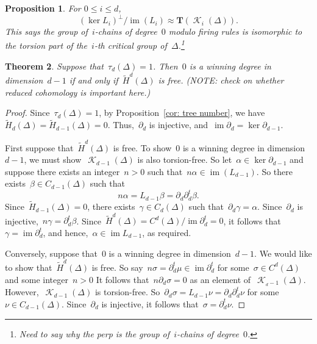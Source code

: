 \documentclass[12pt]{article}
\newcommand{\T}{\mathbf{T}}
\newcommand{\tH}{\widetilde{H}}
\DeclareMathOperator{\im}{\mathrm{im}}
\DeclareMathOperator{\crit}{\mathcal{K}}
\newtheorem{theorem}{Theorem}[section]
\newtheorem{prop}[theorem]{Proposition}
\theoremstyle{definition}
\theoremstyle{remark}
\begin{document}
\begin{prop}\label{prop: deg 0 iso} For $0\leq i\leq d$, 
\[
  (\ker L_i)^{\perp}/\im(L_i)\approx \T(\crit_i(\Delta)).
\]
This says the group of~$i$-chains of degree~$0$ modulo firing rules is
isomorphic to the torsion part of the~$i$-th critical group
of~$\Delta$.\footnote{Need to say why the perp is the group of~$i$-chains of
degree~$0$.}
\end{prop}

\begin{theorem} Suppose that~$\tau_d(\Delta)=1$.  Then~$0$ is a winning degree in
  dimension~$d-1$ if and only if~$\tH^d(\Delta)$ is free. (NOTE: check on
  whether reduced cohomology is important here.)
\end{theorem}
\begin{proof} Since~$\tau_d(\Delta)=1$, by Proposition~\ref{cor: tree number},
  we have~$\tH_d(\Delta)=\tH_{d-1}(\Delta)=0$.  Thus,~$\partial_d$ is injective,
  and~$\im\partial_d=\ker\partial_{d-1}$.

  First suppose that~$\tH^d(\Delta)$ is free.  To show~$0$ is a winning degree
  in dimension~$d-1$, we must show~$\crit_{d-1}(\Delta)$ is also torsion-free.
  So let~$\alpha\in\ker\partial_{d-1}$ and suppose there exists an
  integer~$n>0$ such that~$n\alpha\in\im(L_{d-1})$.  So there exists~$\beta\in
  C_{d-1}(\Delta)$ such that
  \[
    n\alpha=L_{d-1}\beta=\partial_d\partial_d^t\beta.
  \]
  Since~$\tH_{d-1}(\Delta)=0$,
  there exists~$\gamma\in C_d(\Delta)$ such that~$\partial_d\gamma=\alpha$.  
  Since~$\partial_d$ is injective,~$n\gamma=\partial_d^t\beta$.
  Since~$\tH^d(\Delta)=C^d(\Delta)/\im\partial_d^t=0$, it follows
  that~$\gamma=\im\partial_d^t$, and hence,~$\alpha\in\im L_{d-1}$, as required.

  Conversely, suppose that~$0$ is a winning degree in dimension~$d-1$.  We would
  like to show that~$\tH^d(\Delta)$ is free.  So
  say~$n\sigma=\partial_d^t\mu\in\im\partial_d^t$ for some~$\sigma\in
  C^d(\Delta)$ and some integer~$n>0$
  It follows that~$n\partial_d\sigma=0$ as an element of~$\crit_{_d-1}(\Delta)$.
  However,~$\crit_{d-1}(\Delta)$ is torsion-free.
  So~$\partial_d\sigma=L_{d-1}\nu=\partial_d\partial_d^t\nu$ for some~$\nu\in
  C_{d-1}(\Delta)$.  Since~$\partial_d$ is injective, it follows
  that~$\sigma=\partial_d^t\nu$.
\end{proof}
\end{document}

